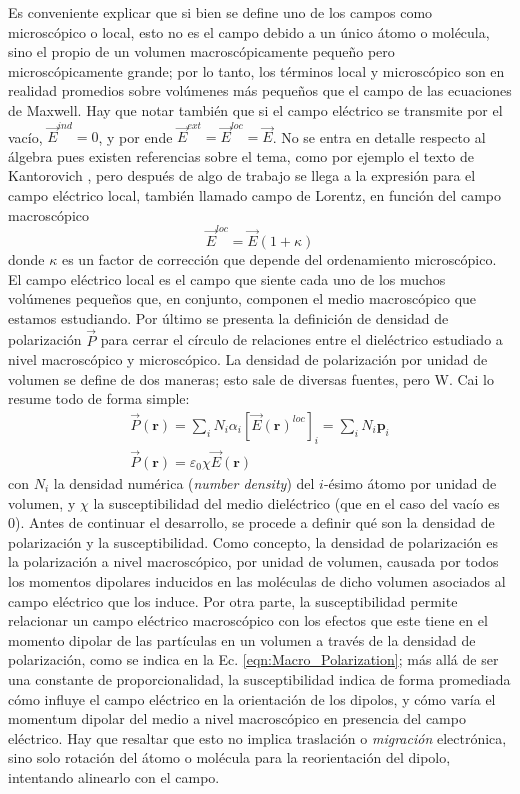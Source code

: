 \documentclass[12pt, oneside, numbers, spanish]{ezthesis}
\numberwithin{equation}{section}
\begin{document}
Es conveniente explicar que si bien se define uno de los campos como microscópico o local, esto no es el campo debido a un único átomo o molécula, sino el propio de un volumen macroscópicamente pequeño pero microscópicamente grande; por lo tanto, los términos local y microscópico son en realidad promedios sobre volúmenes más pequeños que el campo de las ecuaciones de Maxwell. Hay que notar también que si el campo eléctrico se transmite por el vacío, $\vec{E}^{ind} = 0$, y por ende $\vec{E}^{ext} = \vec{E}^{loc} = \vec{E}$. No se entra en detalle respecto al álgebra pues existen referencias sobre el tema, como por ejemplo el texto de Kantorovich \cite{Kantorovich}, pero después de algo de trabajo se llega a la expresión para el campo eléctrico local, también llamado campo de Lorentz, en función del campo macroscópico
\begin{equation}
\vec{E}^{loc} = \vec{E}(1 + \kappa)\label{eqn:Local_Field}
\end{equation}
donde $\kappa$ es un factor de corrección que depende del ordenamiento microscópico. El campo eléctrico local es el campo que siente cada uno de los muchos volúmenes pequeños que, en conjunto, componen el medio macroscópico que estamos estudiando. Por último se presenta la definición de densidad de polarización $\vec{P}$ para cerrar el círculo de relaciones entre el dieléctrico estudiado a nivel macroscópico y microscópico. La densidad de polarización por unidad de volumen se define de dos maneras; esto sale de diversas fuentes, pero W. Cai \cite{Cai} lo resume todo de forma simple:
\begin{gather}
\vec{P}(\mathbf{r}) = \sum_i N_i\alpha_i\left[\vec{E}(\mathbf{r})^{loc}\right]_i = \sum_i N_i\mathbf{p}_i\label{eqn:Micro_Polarization_sumation}\\
\vec{P}(\mathbf{r}) = \varepsilon_0\chi\vec{E}(\mathbf{r})\label{eqn:Macro_Polarization}
\end{gather}
con $N_i$ la densidad numérica (\textit{number density}) del $i$-ésimo átomo por unidad de volumen, y $\chi$ la susceptibilidad del medio dieléctrico (que en el caso del vacío es 0). Antes de continuar el desarrollo, se procede a definir qué son la densidad de polarización y la susceptibilidad. Como concepto, la densidad de polarización es la polarización a nivel macroscópico, por unidad de volumen, causada por todos los momentos dipolares inducidos en las moléculas de dicho volumen asociados al campo eléctrico que los induce. Por otra parte, la susceptibilidad permite relacionar un campo eléctrico macroscópico con los efectos que este tiene en el momento dipolar de las partículas en un volumen a través de la densidad de polarización, como se indica en la Ec. \ref{eqn:Macro_Polarization}; más allá de ser una constante de proporcionalidad, la susceptibilidad indica de forma promediada cómo influye el campo eléctrico en la orientación de los dipolos, y cómo varía el momentum dipolar del medio a nivel macroscópico en presencia del campo eléctrico. Hay que resaltar que esto no implica traslación o \textit{migración} electrónica, sino solo rotación del átomo o molécula para la reorientación del dipolo, intentando alinearlo con el campo.\\\\
\end{document}
